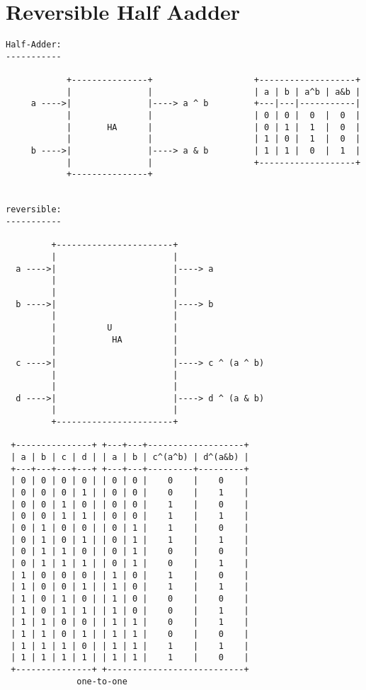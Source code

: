 \documentclass{article}
\begin{document}
\section{Reversible Half Aadder}
\begin{verbatim}
Half-Adder:
-----------

            +---------------+                    +-------------------+
            |               |                    | a | b | a^b | a&b |               
     a ---->|               |----> a ^ b         +---|---|-----------|               
            |               |                    | 0 | 0 |  0  |  0  |               
            |       HA      |                    | 0 | 1 |  1  |  0  |               
            |               |                    | 1 | 0 |  1  |  0  |               
     b ---->|               |----> a & b         | 1 | 1 |  0  |  1  |               
            |               |                    +-------------------+               
            +---------------+                                            


reversible:
-----------
                                                          
         +-----------------------+                                                  
         |                       |                                                  
  a ---->|                       |----> a                                           
         |                       |                                                  
         |                       |                                                  
  b ---->|                       |----> b                                           
         |                       |                                                  
         |          U            |                                                  
         |           HA          |
         |                       |
  c ---->|                       |----> c ^ (a ^ b)   
         |                       |
         |                       |
  d ---->|                       |----> d ^ (a & b)  
         |                       |
         +-----------------------+

 +---------------+ +---+---+-------------------+
 | a | b | c | d | | a | b | c^(a^b) | d^(a&b) |
 +---+---+---+---+ +---+---+---------+---------+
 | 0 | 0 | 0 | 0 | | 0 | 0 |    0    |    0    |
 | 0 | 0 | 0 | 1 | | 0 | 0 |    0    |    1    |
 | 0 | 0 | 1 | 0 | | 0 | 0 |    1    |    0    |
 | 0 | 0 | 1 | 1 | | 0 | 0 |    1    |    1    |
 | 0 | 1 | 0 | 0 | | 0 | 1 |    1    |    0    |
 | 0 | 1 | 0 | 1 | | 0 | 1 |    1    |    1    |
 | 0 | 1 | 1 | 0 | | 0 | 1 |    0    |    0    |
 | 0 | 1 | 1 | 1 | | 0 | 1 |    0    |    1    |
 | 1 | 0 | 0 | 0 | | 1 | 0 |    1    |    0    |
 | 1 | 0 | 0 | 1 | | 1 | 0 |    1    |    1    |
 | 1 | 0 | 1 | 0 | | 1 | 0 |    0    |    0    |
 | 1 | 0 | 1 | 1 | | 1 | 0 |    0    |    1    |
 | 1 | 1 | 0 | 0 | | 1 | 1 |    0    |    1    |
 | 1 | 1 | 0 | 1 | | 1 | 1 |    0    |    0    |
 | 1 | 1 | 1 | 0 | | 1 | 1 |    1    |    1    |
 | 1 | 1 | 1 | 1 | | 1 | 1 |    1    |    0    |
 +---------------+ +---------------------------+
              one-to-one




\end{verbatim}
\end{document}
